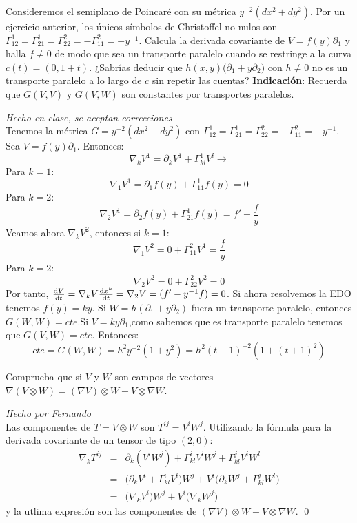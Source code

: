 \begin{problem}[5]Consideremos el semiplano de Poincaré con su métrica $y^{-2}(dx^2+dy^2)$. Por un ejercicio anterior, los únicos símbolos de Christoffel no nulos son $\Gamma_{12}^1=\Gamma_{21}^1=\Gamma_{22}^2=
	-\Gamma_{11}^2=-y^{-1}$. Calcula la derivada covariante de $V=f(y)\partial_1$ y halla $f\ne 0$ de modo que  sea un transporte paralelo cuando se restringe a la curva $c(t)=(0,1+t)$.
	¿Sabrías deducir que $h(x,y)\big(\partial_1+y\partial_2)$ con $h\ne 0$ no es un transporte paralelo a lo largo de $c$ sin repetir las cuentas? 
	\textbf{Indicación}: 
	Recuerda que $G(V,V)$ y $G(V,W)$ son constantes por transportes paralelos. 
	
	\solution\textit{Hecho en clase, se aceptan correcciones}\\ Tenemos la métrica $G=y^{-2}(dx^2+dy^2)$ con $\Gamma^1_{12}=\Gamma^1_{21}=\Gamma^2_{22}=-\Gamma^2_{11}=-y^{-1}$. Sea $V=f(y)\partial_1$. Entonces: $$\nabla_kV^1=\partial_kV^1+\Gamma^1_{kl}V^l\longrightarrow$$Para $k=1$:$$\nabla_1V^1=\partial_1f(y)+\Gamma^1_{11}f(y)=0$$Para $k=2$:$$\nabla_2V^1=\partial_2f(y)+\Gamma^1_{21}f(y)=f'-\frac{f}{y}$$ Veamos ahora $\nabla_kV^2$, entonces si $k=1$: $$\nabla_1V^2=0+\Gamma^2_{11}V^1=\frac{f}{y}$$ Para $k=2$: $$\nabla_2V^2=0+\Gamma^2_{22}V^2=0$$ Por tanto, $\dv{V}{t}=\nabla_kV\dv{x^k}{t}=\nabla_2V=(f'-y^{-1}f)=0$. Si ahora resolvemos la EDO tenemos $f(y)=ky$. Si $W=h(\partial_1+y\partial_2)$ fuera un transporte paralelo, entonces $G(W,W)=cte$.Si $V=ky\partial_1$,como sabemos que es transporte paralelo tenemos que $G(V,W)=cte$. Entonces: $$cte=G(W,W)=h^2y^{-2}(1+y^2)=h^2(t+1)^{-2}(1+(t+1)^2)$$

	
\end{problem}
\begin{problem}[6]Comprueba que si $V$ y $W$ son campos de vectores
	$\nabla(V\otimes W)=(\nabla V)\otimes W+V\otimes
	\nabla W$.
	
	\solution\textit{Hecho por Fernando}\\ Las componentes de $T = V\otimes W$ son $T^{ij}=V^iW^j$. Utilizando la fórmula para la derivada covariante de un tensor de tipo $(2,0)$:
	\begin{eqnarray*}
		\nabla_k T^{ij}
		&=&
		\partial_k(V^iW^j)
		+
		\Gamma_{kl}^i V^lW^j
		+
		\Gamma_{kl}^j V^iW^l
		\\
		&=&
		\Big( \partial_k V^i + \Gamma_{kl}^i V^l \Big)W^j
		+
		V^i
		\Big( \partial_k W^j + \Gamma_{kl}^j W^l \Big)
		\\
		&=&
		\Big(\nabla_k V^i\big)W^j
		+
		V^i\Big(\nabla_k W^j\big)
	\end{eqnarray*}
	y la utlima expresión son las componentes de $(\nabla V)\otimes W+V\otimes
	\nabla W$.
\qed	
\end{problem}
